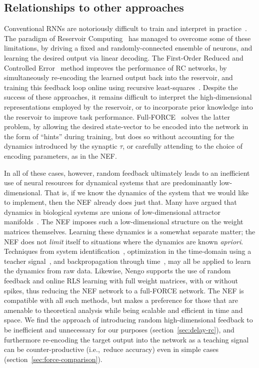 \subsection{Relationships to other approaches}
\label{sec:relationships}

Conventional RNNs are notoriously difficult to train and interpret in practice~\citep{bengio1994learning}.
The paradigm of Reservoir Computing~\citep[RC;][]{jaeger2001echo, maass2002real} has managed to overcome some of these limitations, by driving a fixed and randomly-connected ensemble of neurons, and learning the desired output via linear decoding.
The First-Order Reduced and Controlled Error~\citep[FORCE;][]{sussillo2009generating} method improves the performance of RC networks, by simultaneously re-encoding the learned output back into the reservoir, and training this feedback loop online using recursive least-squares~\citep[RLS;][]{haykin1991adaptive}.
Despite the success of these approaches, it remains difficult to interpret the high-dimensional representations employed by the reservoir, or to incorporate prior knowledge into the reservoir to improve task performance.
Full-FORCE~\citep{depasquale2018full} solves the latter problem, by allowing the desired state-vector to be encoded into the network in the form of ``hints'' during training, but does so without accounting for the dynamics introduced by the synaptic $\tau$, or carefully attending to the choice of encoding parameters, as in the NEF.

In all of these cases, however, random feedback ultimately leads to an inefficient use of neural resources for dynamical systems that are predominantly low-dimensional.
That is, if we know the dynamics of the system that we would like to implement, then the NEF already does just that.
Many have argued that dynamics in biological systems are unions of low-dimensional attractor manifolds~\citep{sussillo2013opening, cunningham2014dimensionality, waernberg2017low}.
The NEF imposes such a low-dimensional structure on the weight matrices themselves.
Learning these dynamics is a somewhat separate matter; the NEF does not \emph{limit} itself to situations where the dynamics are known \emph{apriori}.
Techniques from system identification~\citep{nelles2013nonlinear}, optimization in the time-domain using a teacher signal~\citep{duggins2017incorporating}, and backpropagation through time~\citep{rasmussen2018nengodl}, may all be applied to learn the dynamics from raw data.
Likewise, Nengo supports the use of random feedback and online RLS learning with full weight matrices, with or without spikes, thus reducing the NEF network to a full-FORCE network.
The NEF is compatible with all such methods, but makes a preference for those that are amenable to theoretical analysis while being scalable and efficient in time and space.
We find the approach of introducing random high-dimensional feedback to be inefficient and unnecessary for our purposes (section~\ref{sec:delay-rc}), and furthermore re-encoding the target output into the network as a teaching signal can be counter-productive (i.e.,~reduce accuracy) even in simple cases (section~\ref{sec:force-comparison}).

